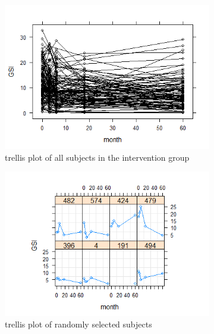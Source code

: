\begin{figure}[H]
\begin{subfigure}{.33\textwidth}
  \centering
  \includegraphics[width=1\linewidth]{../../plots/trellis_treatment.png}
  \caption{trellis plot of all subjects in the intervention group}
\end{subfigure}
\begin{subfigure}{.33\textwidth}
  \centering
  \includegraphics[width=1\linewidth]{../../plots/trellis_subset_treatment.png}
  \caption{trellis plot of randomly selected subjects}
\end{subfigure}
\begin{subfigure}{.33\textwidth}
  \centering

\end{subfigure}
\end{figure}
